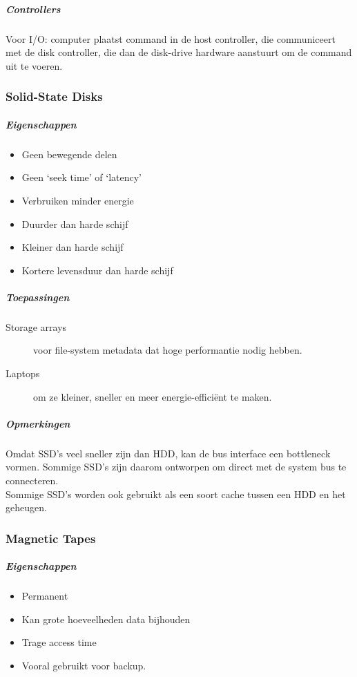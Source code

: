 \subparagraph{Controllers}
Voor I/O: computer plaatst command in de host controller, die communiceert met de disk controller, die dan de disk-drive hardware aanstuurt om de command uit te voeren.
\subsubsection{Solid-State Disks}
\subparagraph{Eigenschappen}
\begin{itemize}
	\item Geen bewegende delen
	\item Geen `seek time' of `latency'
	\item Verbruiken minder energie
	\item Duurder dan harde schijf
	\item Kleiner dan harde schijf
	\item Kortere levensduur dan harde schijf
\end{itemize}

\subparagraph{Toepassingen}
\begin{description}
	\item[Storage arrays] voor file-system metadata dat hoge performantie nodig hebben.
	\item[Laptops] om ze kleiner, sneller en meer energie-effici\"{e}nt te maken.
\end{description}

\subparagraph{Opmerkingen}
Omdat SSD's veel sneller zijn dan HDD, kan de bus interface een bottleneck vormen. Sommige SSD's zijn daarom ontworpen om direct met de system bus te connecteren. \\
Sommige SSD's worden ook gebruikt als een soort cache tussen een HDD en het geheugen.
\subsubsection{Magnetic Tapes}
\subparagraph{Eigenschappen}
\begin{itemize}
	\item Permanent
	\item Kan grote hoeveelheden data bijhouden
	\item Trage access time
	\item Vooral gebruikt voor backup.
\end{itemize}
